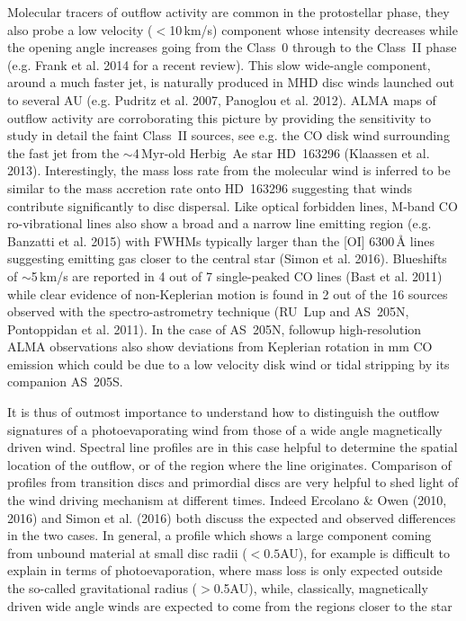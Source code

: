 \documentclass[10pt,fleqn,twoside]{article}
\begin{document}
Molecular tracers of outflow activity are common in the protostellar phase, they also probe a low velocity ($<$10\,km/s) component whose intensity decreases while the opening angle increases going from the Class~0 through to the Class~II phase (e.g. Frank et al. 2014 for a recent review). This slow wide-angle component, around a much faster jet, is naturally produced in MHD disc winds launched out to several AU (e.g. Pudritz et al. 2007, Panoglou et al. 2012). ALMA maps of outflow activity are corroborating this picture by providing the sensitivity to study in detail the faint Class~II sources, see e.g. the CO disk wind surrounding the fast jet from the $\sim$4\,Myr-old Herbig~Ae star HD~163296 (Klaassen et al. 2013). Interestingly, the mass loss rate from the molecular wind is inferred to be similar to the mass accretion rate onto HD~163296 suggesting that winds contribute significantly to disc dispersal. Like optical forbidden lines, M-band CO ro-vibrational lines also show a broad and a narrow line emitting region (e.g. Banzatti et al. 2015) with FWHMs typically larger than the [OI] 6300\,\AA{} lines suggesting emitting gas closer to the central star (Simon et al. 2016). Blueshifts of $\sim$5\,km/s are reported in 4 out of  7 single-peaked CO lines (Bast et al. 2011) while clear evidence of non-Keplerian motion is found in 2 out of the 16 sources observed with the spectro-astrometry technique (RU~Lup and AS~205N, Pontoppidan et al. 2011). In the case of AS~205N, followup high-resolution ALMA observations also show deviations from Keplerian rotation in mm CO emission which could be due to a low velocity disk wind or tidal stripping by its companion AS~205S.

It is thus of outmost importance to understand how to distinguish the outflow signatures of a photoevaporating wind from those of a wide angle magnetically driven wind. Spectral line profiles are in this case helpful to determine the spatial location of the outflow, or of the region where the line originates. Comparison of profiles from transition discs and primordial discs are very helpful to shed light of the wind driving mechanism at different times. Indeed Ercolano \& Owen (2010, 2016) and Simon et al. (2016) both discuss the expected and observed differences in the two cases. In general, a profile which shows a large component coming from unbound material at small disc radii ($<0.5$AU), for example is difficult to explain in terms of photoevaporation, where mass loss is only expected outside the so-called gravitational radius ($>$0.5AU), while, classically, magnetically driven wide angle winds are expected to come from the regions closer to the star
\end{document}
